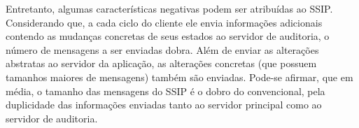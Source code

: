 Entretanto, algumas características negativas podem ser atribuídas ao SSIP. Considerando que, a cada ciclo do cliente ele envia informações adicionais contendo as mudanças concretas de seus estados ao servidor de auditoria, o número de mensagens a ser enviadas dobra. Além de enviar as alterações abstratas ao servidor da aplicação, as alterações concretas (que possuem tamanhos maiores de mensagens) também são enviadas. Pode-se afirmar, que em média, o tamanho das mensagens do SSIP é o dobro do convencional, pela duplicidade das informações enviadas tanto ao servidor principal como ao servidor de auditoria.

